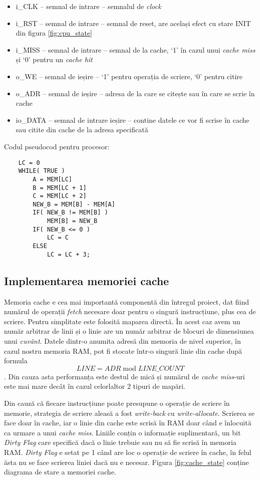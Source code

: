 \documentclass[../main.tex]{subfiles}
\begin{document}
\begin{itemize}
    \item i\_CLK -- semnal de intrare -- semnalul de \emph{clock}
    \item i\_RST -- semnal de intrare -- semnal de reset, are același efect cu stare INIT din figura \ref{fig:cpu_state}
    \item i\_MISS -- semnal de intrare -- semnal de la cache, `1' în cazul unui \emph{cache miss} și `0' pentru un \emph{cache hit}
    \item o\_WE -- semnal de ieșire -- `1' pentru operația de scriere, `0' pentru citire
    \item o\_ADR -- semnal de ieșire -- adresa de la care se citește sau în care se scrie în cache
    \item io\_DATA -- semnal de intrare ieșire -- contine datele ce vor fi scrise în cache sau citite din cache de la 
    adresa specificată
\end{itemize}

\noindent\begin{minipage}{\linewidth}
Codul pseudocod pentru procesor:
\begin{lstlisting}
    LC = 0
    WHILE( TRUE )
        A = MEM[LC]
        B = MEM[LC + 1]
        C = MEM[LC + 2]
        NEW_B = MEM[B] - MEM[A]
        IF( NEW_B != MEM[B] )
            MEM[B] = NEW_B
        IF( NEW_B <= 0 )
            LC = C
        ELSE
            LC = LC + 3;
\end{lstlisting}
\end{minipage}

\subsection{Implementarea memoriei cache}
Memoria cache e cea mai importantă componentă din întregul proiect, dat fiind numărul de operații \emph{fetch} necesare
doar pentru o singură instrucțiune, plus cea de scriere. Pentru simplitate este folosită maparea directă. În acest caz
avem un număr arbitrar de linii și o linie are un număr arbitrar de blocuri de dimensiunea unui \emph{cuvânt}.
Datele dintr-o anumita adresă din memoria de nivel superior, în cazul nostru memoria RAM, pot fi stocate într-o singură
linie din cache după formula $$LINE = ADR \;\mathrm{mod}\; LINE\_COUNT$$. Din cauza asta performanța este destul de mică și numărul
de \emph{cache miss}-uri este mai mare decât în cazul celorlaltor 2 tipuri de mapări.

Din cauză că fiecare instrucțiune poate presupune o operație de scriere în memorie, strategia de scriere aleasă a fost
\emph{write-back} cu \emph{write-allocate}. Scrierea se face doar în cache, iar o linie din cache este scrisă în RAM
doar când e înlocuită ca urmare a unui \emph{cache miss}. Liniile conțin o informație suplimentară, un bit \emph{Dirty Flag}
care specifică dacă o linie trebuie sau nu să fie scrisă în memoria RAM. \emph{Dirty Flag} e setat pe 1 când are loc o
operație de scriere în cache, în felul ăsta nu se face scrierea liniei dacă nu e necesar. Figura \ref{fig:cache_state}
conține diagrama de stare a memoriei cache.
\end{document}
